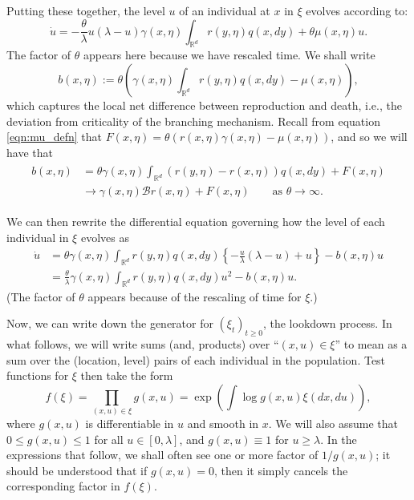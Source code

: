 \documentclass[12pt]{article}
\newcommand{\IR}{\mathbb R}
\newcommand{\DG}{\mathcal{B}}  %
\newcommand{\lp}{\xi}              %
\begin{document}
Putting these together,
the level $u$ of an individual at $x$ in $\lp$ evolves according to:
\begin{equation} \label{eqn:dot_u}
    \dot u
    =
    - \frac{\theta}{\lambda} u \left(\lambda - u\right)
    \gamma(x, \eta) \int_{\IR^d} r(y, \eta) q(x, dy) 
    +
    \theta \mu(x,\eta) u .
\end{equation}
The factor of $\theta$ appears here because we have rescaled time.
We shall write 
$$
    b(x, \eta)
    :=
    \theta\left(
    \gamma(x,\eta) \int_{\IR^d} r(y, \eta) q(x, dy)
    -
    \mu(x,\eta)
    \right) ,
$$
which captures the local net difference between reproduction and death,
i.e., the deviation from criticality of the branching mechanism.
Recall from equation \eqref{eqn:mu_defn} that
$F(x,\eta) = \theta(r(x,\eta)\gamma(x,\eta) - \mu(x,\eta))$,
and so we will have that
\begin{align} \label{eqn:b_limit}
\begin{split}
b(x, \eta)
&=
    \theta \gamma(x, \eta) \int_{\IR^d} \left( r(y, \eta) - r(x, \eta) \right) q(x, dy)
    + F(x, \eta) \\
&\to
    \gamma(x, \eta) \DG r(x, \eta) + F(x, \eta) \qquad \text{as } \theta \to \infty .
\end{split}
\end{align}

We can then rewrite the differential equation 
governing how the level of each individual
in $\lp$ evolves as
\begin{align}
\dot{u}
    &=
    \theta \gamma(x,\eta) \int_{\IR^d} r(y, \eta) q(x, dy)
    \left\{
        -\frac{u}{\lambda}\left(\lambda - u\right)
        + u
    \right\}
    -
    b(x,\eta) u
    \nonumber \\
    &=
    \frac{\theta}{\lambda} \gamma(x,\eta) \int_{\IR^d} r(y, \eta) q(x, dy) u^2
    -
    b(x, \eta) u
    . \label{differential equation for level}
\end{align}
(The factor of $\theta$ appears because of the rescaling of time for $\lp$.)

Now, we can write down the generator for $(\lp_t)_{t \ge 0}$,
the lookdown process.
In what follows, we will write sums (and, products) over ``$(x, u) \in \xi$''
to mean as a sum over the (location, level) pairs of each individual in the population.
Test functions for $\lp$ then take the form
\begin{equation} \label{eqn:test_functions}
f(\lp)=\prod_{(x,u)\in \lp}g(x,u)=\exp\left(\int \log g(x,u)\lp(dx, du)\right),
\end{equation}
where
$g(x,u)$ is differentiable in $u$ and 
smooth in $x$.
We will also assume that $0\leq g(x,u) \leq 1$ for all $u\in [0,\lambda]$,
and $g(x,u)\equiv 1$ for $u\geq \lambda$.
In the expressions that follow,
we shall often see one or more factor of $1/g(x,u)$;
it should be understood that if $g(x,u)=0$,
then it simply cancels 
the corresponding factor in $f(\lp)$.
\end{document}
